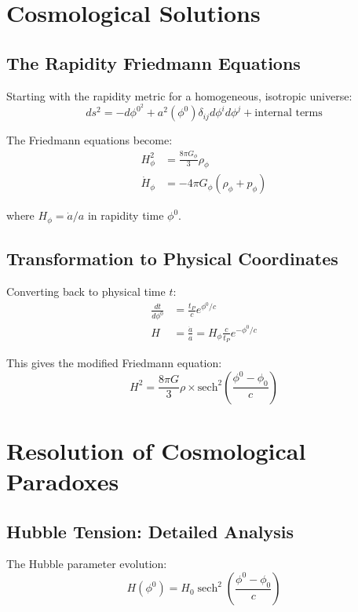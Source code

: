\documentclass[12pt,a4paper]{article}
\begin{document}
\section{Cosmological Solutions}

\subsection{The Rapidity Friedmann Equations}

Starting with the rapidity metric for a homogeneous, isotropic universe:
\begin{equation}
ds^2 = -d\phi^{0^2} + a^2(\phi^0) \delta_{ij} d\phi^i d\phi^j + \text{internal terms}
\end{equation}

The Friedmann equations become:
\begin{align}
H_\phi^2 &= \frac{8\pi G_\phi}{3} \rho_\phi \\
\dot{H}_\phi &= -4\pi G_\phi (\rho_\phi + p_\phi)
\end{align}

where $H_\phi = \dot{a}/a$ in rapidity time $\phi^0$.

\subsection{Transformation to Physical Coordinates}

Converting back to physical time $t$:
\begin{align}
\frac{dt}{d\phi^0} &= \frac{t_P}{c} e^{\phi^0/c} \\
H &= \frac{\dot{a}}{a} = H_\phi \frac{c}{t_P} e^{-\phi^0/c}
\end{align}

This gives the modified Friedmann equation:
\begin{equation}
H^2 = \frac{8\pi G}{3} \rho \times \text{sech}^2\left(\frac{\phi^0 - \phi_0}{c}\right)
\end{equation}

\section{Resolution of Cosmological Paradoxes}

\subsection{Hubble Tension: Detailed Analysis}

The Hubble parameter evolution:
\begin{equation}
H(\phi^0) = H_0 \operatorname{sech}^2\left(\frac{\phi^0 - \phi_0}{c}\right)
\end{equation}
\end{document}
